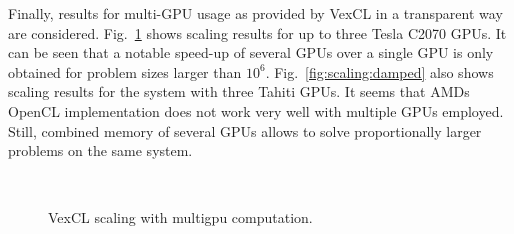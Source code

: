 \documentclass[final]{siamltex}
\newcommand{\figref}[1]{Fig.~\ref{#1}}
\begin{document}


Finally, results for multi-GPU usage as provided by VexCL in a transparent way are considered.
\figref{fig:scaling} shows scaling results for up to three Tesla C2070 GPUs.
It can be seen that a notable speed-up of several GPUs over a single GPU is only obtained for problem sizes
larger than $10^6$.
\figref{fig:scaling:damped} also shows scaling results for the system with three Tahiti GPUs.
It seems that AMDs OpenCL
implementation does not work very well with multiple GPUs employed. Still,
combined memory of several GPUs allows to solve proportionally larger problems
on the same system.


\begin{figure}
    \begin{center}
        $\;$
        $\;$
    \end{center}
    \caption{VexCL scaling with multigpu computation.}
    \label{fig:scaling}
\end{figure}
\end{document}
